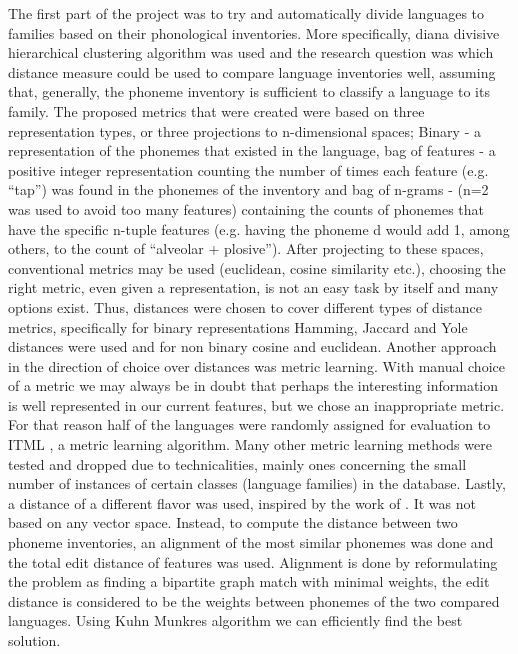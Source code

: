 \documentclass[letterpaper, 11pt]{article}
\begin{document}
The first part of the project was to try and automatically divide languages to families based on their phonological inventories. More specifically, diana divisive hierarchical clustering algorithm was used and the research question was which distance measure could be used to compare language inventories well, assuming that, generally, the phoneme inventory is sufficient to classify a language to its family. The proposed metrics that were created were based on three representation types, or three projections to n-dimensional spaces; Binary - a representation of the phonemes that existed in the language, bag of features - a positive integer representation counting the number of times each feature (e.g. “tap”) was found in the phonemes of the inventory and bag of n-grams - (n=2 was used to avoid too many features) containing the counts of phonemes that have the specific n-tuple features (e.g. having the phoneme d would add 1, among others, to the count of “alveolar + plosive”). After projecting to these spaces, conventional metrics may be used (euclidean, cosine similarity etc.), choosing the right metric, even given a representation, is not an easy task by itself and many options exist. Thus, distances were chosen to cover different types of distance metrics\cite{cha2007comprehensive,choi2010survey}, specifically for binary representations Hamming, Jaccard and Yole distances were used and for non binary cosine and euclidean.
Another approach in the direction of choice over distances was metric learning. With manual choice of a metric we may always be in doubt that perhaps the interesting information is well represented in our current features, but we chose an inappropriate metric. For that reason half of the languages were randomly assigned for evaluation to ITML \cite{davis2007information}, a metric learning algorithm. Many other metric learning methods \cite{shental2002adjustment} were tested and dropped due to technicalities, mainly ones concerning the small number of instances of certain classes (language families) in the database.
Lastly, a distance of a different flavor was used, inspired by the work of . It was not based on any vector space. Instead, to compute the distance between two phoneme inventories, an alignment of the most similar phonemes was done and the total edit distance of features was used. Alignment is done by reformulating the problem as finding a bipartite graph match with minimal weights, the edit distance is considered to be the weights between phonemes of the two compared languages. Using Kuhn Munkres algorithm we can efficiently find the best solution.
\end{document}

